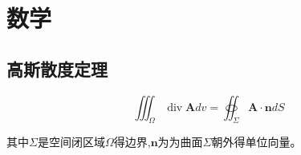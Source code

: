 \section{数学}

\subsection{高斯散度定理}

\begin{equation*}
    \iiint_{\Omega} \operatorname{div} \mathbf{A} d v=\oiint_{\Sigma} \mathbf{A} \cdot \mathbf{n} d S
\end{equation*}

其中$\Sigma$是空间闭区域$\Omega$得边界,$\mathbf{n}$为为曲面$\Sigma$朝外得单位向量。